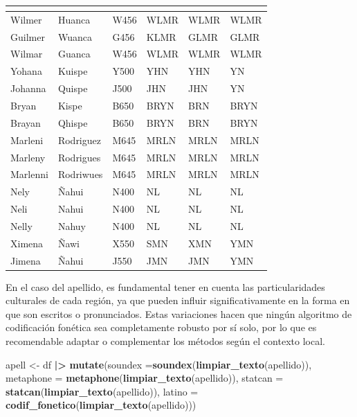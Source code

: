 \documentclass[
  12pt,
]{book}
\newenvironment{Shaded}{\begin{snugshade}}{\end{snugshade}}
\newcommand{\AttributeTok}[1]{\textcolor[rgb]{0.13,0.29,0.53}{#1}}
\newcommand{\FunctionTok}[1]{\textcolor[rgb]{0.13,0.29,0.53}{\textbf{#1}}}
\newcommand{\NormalTok}[1]{#1}
\newcommand{\OtherTok}[1]{\textcolor[rgb]{0.56,0.35,0.01}{#1}}
\newcommand{\SpecialCharTok}[1]{\textcolor[rgb]{0.81,0.36,0.00}{\textbf{#1}}}
\begin{document}
\begin{table}[t]
\fontsize{12.0pt}{14.0pt}\selectfont
\begin{tabular*}{\linewidth}{@{\extracolsep{\fill}}llllll}
\toprule
{\bfseries \cellcolor[HTML]{F9F9F9}{nombre}} & {\bfseries \cellcolor[HTML]{F9F9F9}{apellido}} & {\bfseries \cellcolor[HTML]{F9F9F9}{soundex}} & {\bfseries \cellcolor[HTML]{F9F9F9}{metaphone}} & {\bfseries \cellcolor[HTML]{F9F9F9}{statcan}} & {\bfseries \cellcolor[HTML]{F9F9F9}{latino}} \\ 
\midrule\addlinespace[2.5pt]
Wilmer & Huanca & W456 & WLMR & WLMR & WLMR \\ 
Guilmer & Wuanca & G456 & KLMR & GLMR & GLMR \\ 
Wilmar & Guanca & W456 & WLMR & WLMR & WLMR \\ 
Yohana & Kuispe & Y500 & YHN & YHN & YN \\ 
Johanna & Quispe & J500 & JHN & JHN & YN \\ 
Bryan & Kispe & B650 & BRYN & BRN & BRYN \\ 
Brayan & Qhispe & B650 & BRYN & BRN & BRYN \\ 
Marleni & Rodriguez & M645 & MRLN & MRLN & MRLN \\ 
Marleny & Rodrigues & M645 & MRLN & MRLN & MRLN \\ 
Marlenni & Rodriwues & M645 & MRLN & MRLN & MRLN \\ 
Nely & \~Nahui & N400 & NL & NL & NL \\ 
Neli & Nahui & N400 & NL & NL & NL \\ 
Nelly & Nahuy & N400 & NL & NL & NL \\ 
Ximena & \~Nawi & X550 & SMN & XMN & YMN \\ 
Jimena & \~Nahui & J550 & JMN & JMN & YMN \\ 
\bottomrule
\end{tabular*}
\end{table}

En el caso del apellido, es fundamental tener en cuenta las particularidades culturales de cada región, ya que pueden influir significativamente en la forma en que son escritos o pronunciados. Estas variaciones hacen que ningún algoritmo de codificación fonética sea completamente robusto por sí solo, por lo que es recomendable adaptar o complementar los métodos según el contexto local.

\begin{Shaded}
\begin{Highlighting}[]
\NormalTok{apell }\OtherTok{\textless{}{-}}\NormalTok{ df }\SpecialCharTok{|\textgreater{}} 
         \FunctionTok{mutate}\NormalTok{(}\AttributeTok{soundex =}\FunctionTok{soundex}\NormalTok{(}\FunctionTok{limpiar\_texto}\NormalTok{(apellido)),}
                \AttributeTok{metaphone =} \FunctionTok{metaphone}\NormalTok{(}\FunctionTok{limpiar\_texto}\NormalTok{(apellido)),}
                \AttributeTok{statcan =} \FunctionTok{statcan}\NormalTok{(}\FunctionTok{limpiar\_texto}\NormalTok{(apellido)),}
                \AttributeTok{latino =} \FunctionTok{codif\_fonetico}\NormalTok{(}\FunctionTok{limpiar\_texto}\NormalTok{(apellido)))}
\end{Highlighting}
\end{Shaded}
\end{document}
